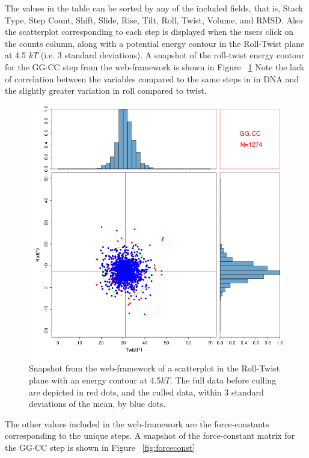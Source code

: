The values in  the table can be sorted by any  of the included fields,
that  is, Stack  Type, Step  Count,  Shift, Slide,  Rise, Tilt,  Roll,
Twist, Volume,  and RMSD. Also  the scatterplot corresponding  to each
step is  displayed when  the users click  on the counts  column, along
with a  potential energy contour in  the Roll-Twist plane  at 4.5 $kT$
(i.e.  3 standard deviations).   A snapshot  of the  roll-twist energy
contour for  the GG$\cdot$CC step  from the web-framework is  shown in
Figure  ~\ref{fig:contour} Note  the lack  of correlation  between the
variables  compared to  the  same steps  in  in DNA  and the  slightly
greater variation in roll compared to twist.
\begin{figure}[htbp]
\centering
\includegraphics[angle=0, scale=0.54]{Chapter4/contour.png}
\caption{Snapshot  from  the web-framework  of  a  scatterplot in  the
  Roll-Twist plane  with an energy  contour at 4.5$kT$. The  full data
  before culling are depicted in red dots, and the culled data, within
  3 standard deviations of the mean, by blue dots.}
\label{fig:contour}
\end{figure}

The other values included in the web-framework are the force-constants
corresponding to  the unique steps.  A snapshot of  the force-constant
matrix    for   the    GG$\cdot$CC   step    is   shown    in   Figure
~\ref{fig:forceconst}

